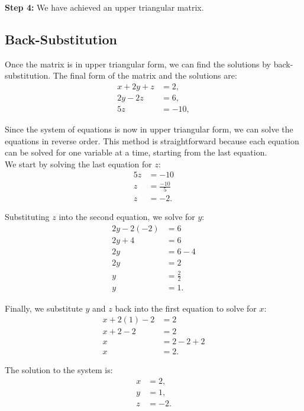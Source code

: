 \textbf{Step 4:} We have achieved an upper triangular matrix.

\subsection*{Back-Substitution}

Once the matrix is in upper triangular form, we can find the solutions by back-substitution. The final form of the matrix and the solutions are:
\begin{align}
    x + 2y + z &= 2, \\
    2y - 2z &= 6, \\
    5z &= -10,
\end{align}

Since the system of equations is now in upper triangular form, we can solve the equations in reverse order. This method is straightforward because each equation can be solved for one variable at a time, starting from the last equation.\\


We start by solving the last equation for \( z \):
\begin{align*}
    5z &= -10 \\
    z &= \frac{-10}{5} \\
    z &= -2.
\end{align*}


Substituting \( z \) into the second equation, we solve for \( y \):
\begin{align*}
    2y - 2(-2) &= 6 \\
    2y + 4 &= 6 \\
    2y &= 6 - 4 \\
    2y &= 2 \\
    y &= \frac{2}{2} \\
    y &= 1.
\end{align*}


Finally, we substitute \( y \) and \( z \) back into the first equation to solve for \( x \):
\begin{align*}
    x + 2(1) - 2 &= 2 \\
    x + 2 - 2 &= 2 \\
    x &= 2 - 2 + 2 \\
    x &= 2.
\end{align*}



The solution to the system is:
\begin{align*}
    x &= 2, \\
    y &= 1, \\
    z &= -2.
\end{align*}





